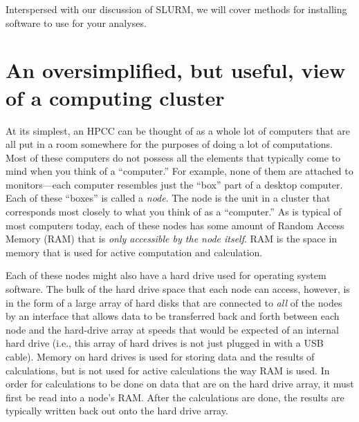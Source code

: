 \documentclass[]{krantz}
\begin{document}
Interspersed with our discussion of SLURM, we will cover
methods for installing software to use for your analyses.

\hypertarget{an-oversimplified-but-useful-view-of-a-computing-cluster}{%
\section{An oversimplified, but useful, view of a computing cluster}\label{an-oversimplified-but-useful-view-of-a-computing-cluster}}

At its simplest, an HPCC can be thought of as a whole lot of computers that are all
put in a room somewhere for the purposes of doing a lot of computations. Most of these
computers do not possess all the elements that typically come to mind when you
think of a ``computer.'' For example, none of them are attached to monitors---each
computer resembles just the ``box'' part of a desktop computer. Each of these ``boxes'' is called
a \emph{node}. The node is the unit in a cluster that corresponds most closely to what you think of
as a ``computer.'' As is typical of most computers today, each of these nodes has some
amount of Random Access Memory (RAM) that is \emph{only accessible by the node itself}. RAM
is the space in memory that is used for active computation and calculation.

Each of these
nodes might also have a hard drive used for operating system software. The bulk of the
hard drive space that each node can access, however, is in the form of a large array of hard disks
that are connected to \emph{all} of the nodes by an interface that allows data to be transferred
back and forth between each node and the hard-drive array at speeds that would be expected of
an internal hard drive (i.e., this array of hard drives is not just plugged in with a USB
cable). Memory on hard drives is used for storing data and the results of calculations, but
is not used for active calculations the way RAM is used. In order for calculations to be done
on data that are on the hard drive array, it must first be read into a node's RAM. After the calculations
are done, the results are typically written back out onto the hard drive array.
\end{document}

